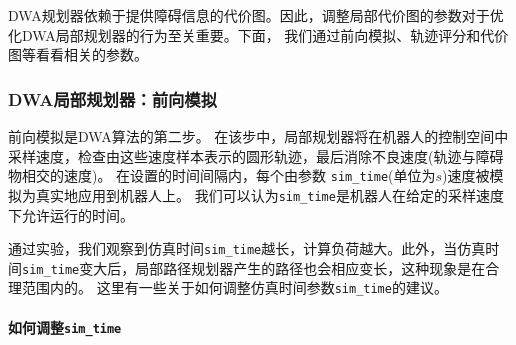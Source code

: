 DWA规划器依赖于提供障碍信息的代价图。因此，调整局部代价图的参数对于优化DWA局部规划器的行为至关重要。下面，
我们通过前向模拟、轨迹评分和代价图等看看相关的参数。


\subsubsection[DWA Local Planner : Forward Simulation]{DWA局部规划器：前向模拟}


前向模拟是DWA算法的第二步。
在该步中，局部规划器将在机器人的控制空间中采样速度，检查由这些速度样本表示的圆形轨迹，最后消除不良速度(轨迹与障碍物相交的速度)。
在设置的时间间隔内，每个由参数 \texttt{sim\_time}(单位为$s$)速度被模拟为真实地应用到机器人上。
我们可以认为\texttt{sim\_time}是机器人在给定的采样速度下允许运行的时间。


通过实验，我们观察到仿真时间\texttt{sim\_time}越长，计算负荷越大。此外，当仿真时间\texttt{sim\_time}变大后，局部路径规划器产生的路径也会相应变长，这种现象是在合理范围内的。
这里有一些关于如何调整仿真时间参数\texttt{sim\_time}的建议。

\paragraph[How to tune \texttt{sim\_time}]{如何调整\texttt{sim\_time}}



